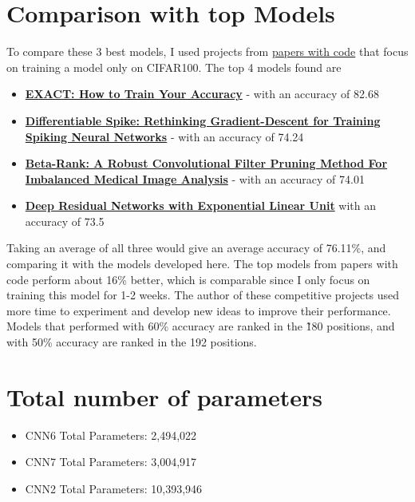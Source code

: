 \documentclass[conference]{IEEEtran}
\begin{document}
\section{Comparison with top Models} \label{sec: comparision}
To compare these 3 best models, I used projects from \href{https://paperswithcode.com/sota/image-classification-on-cifar-100 }{papers with code} that focus on training a model only on CIFAR100.
The top 4 models found are
\begin{itemize}
    \item \textbf{\href{https://paperswithcode.com/paper/exact-how-to-train-your-accuracy}{EXACT: How to Train Your Accuracy}} - with an accuracy of 82.68
    \item \textbf{\href{https://paperswithcode.com/paper/differentiable-spike-rethinking-gradient}{Differentiable Spike: Rethinking Gradient-Descent for Training Spiking Neural Networks}} - with an accuracy of 74.24
    \item \textbf{\href{https://paperswithcode.com/paper/beta-rank-a-robust-convolutional-filter}{Beta-Rank: A Robust Convolutional Filter Pruning Method For Imbalanced Medical Image Analysis}} - with an accuracy of 74.01
    \item \textbf{\href{https://paperswithcode.com/paper/deep-residual-networks-with-exponential}{Deep Residual Networks with Exponential Linear Unit}} with an accuracy of 73.5
\end{itemize}

Taking an average of all three would give an average accuracy of 76.11\%, and comparing it with the models developed here.
The top models from papers with code perform about 16\% better, which is comparable since I only focus on training this model for 1-2 weeks. The author of these competitive projects used more time to experiment and develop new ideas to improve their performance. Models that performed with 60\% accuracy are ranked in the \~180 positions, and with 50\% accuracy are ranked in the 192 positions.


\section{Total number of parameters}
\begin{itemize}
    \item CNN6 Total Parameters: 2,494,022
    \item CNN7 Total Parameters: 3,004,917
    \item CNN2 Total Parameters: 10,393,946
\end{itemize}
\end{document}
